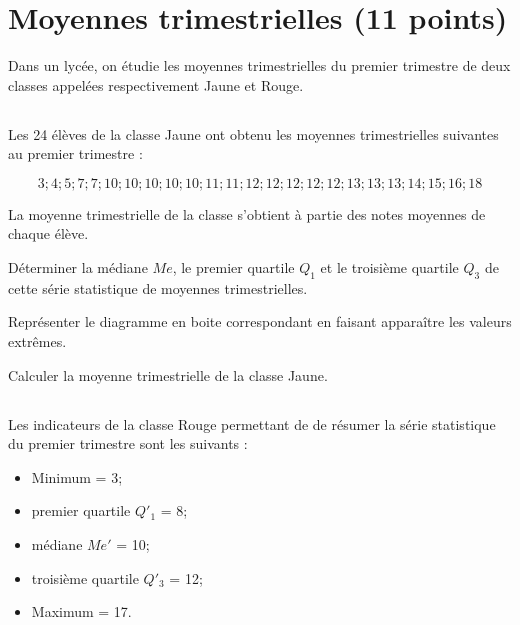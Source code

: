 \section{Moyennes trimestrielles (11 points)}

Dans un lycée, on étudie les moyennes trimestrielles du premier trimestre de deux classes appelées respectivement Jaune et Rouge.

\subsection{}
Les 24 élèves de la classe Jaune ont obtenu les moyennes trimestrielles suivantes au premier trimestre :

\begin{equation*}
3 ; 4 ; 5 ; 7 ; 7 ; 10 ; 10 ; 10 ; 10 ; 10 ; 11 ;  11 ; 12 ; 12 ; 12 ; 12 ; 12 ; 13 ; 13 ; 13 ; 14 ; 15 ; 16 ; 18
\end{equation*}

La moyenne trimestrielle de la classe s'obtient à partie des notes moyennes de chaque élève.

\begin{questions}
	\question[2] Déterminer la médiane $Me$, le premier quartile $Q_1$ et le troisième quartile $Q_3$ de cette série statistique de moyennes trimestrielles.
	
	\question[1] Représenter le diagramme en boite correspondant en faisant apparaître les valeurs extrêmes.
	
	\question[1] Calculer la moyenne trimestrielle de la classe Jaune.
\end{questions}

\subsection{}

Les indicateurs de la classe Rouge permettant de de résumer la série statistique du premier trimestre sont les suivants :

\begin{itemize}
	\item Minimum = 3;
	\item premier quartile $Q'_1$ = 8;
	\item médiane $Me'$ = 10;
	\item troisième quartile $Q'_3$ = 12;
	\item Maximum = 17.
\end{itemize}

